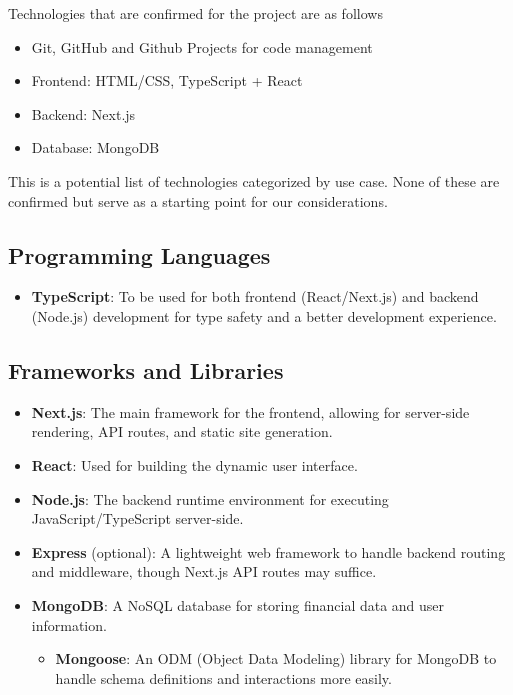 \documentclass{article}
\begin{document}
Technologies that are confirmed for the project are as follows

\begin{itemize}
  \item Git, GitHub and Github Projects for code management
  \item Frontend: HTML/CSS, TypeScript + React
  \item Backend: Next.js
  \item Database: MongoDB
\end{itemize}

This is a potential list of technologies categorized by use case. None of these are confirmed but serve as a starting point for our considerations.

\subsection{Programming Languages}
\begin{itemize}
  \item \textbf{TypeScript}: To be used for both frontend (React/Next.js) and backend (Node.js) development for type safety and a better development experience.
\end{itemize}

\subsection{Frameworks and Libraries}
\begin{itemize}
  \item \textbf{Next.js}: The main framework for the frontend, allowing for server-side rendering, API routes, and static site generation.
  \item \textbf{React}: Used for building the dynamic user interface.
  \item \textbf{Node.js}: The backend runtime environment for executing JavaScript/TypeScript server-side.
  \item \textbf{Express} (optional): A lightweight web framework to handle backend routing and middleware, though Next.js API routes may suffice.
  \item \textbf{MongoDB}: A NoSQL database for storing financial data and user information.
  \begin{itemize}
    \item \textbf{Mongoose}: An ODM (Object Data Modeling) library for MongoDB to handle schema definitions and interactions more easily.
  \end{itemize}
\end{itemize}
\end{document}
